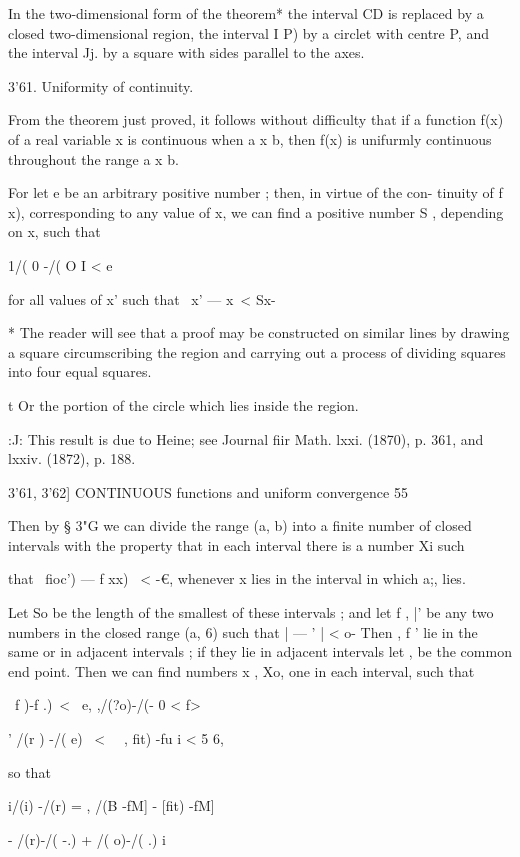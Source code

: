 In the two-dimensional form of the theorem* the interval CD is
replaced by a closed two-dimensional region, the interval I P) by a
circlet with centre P, and the interval Jj. by a square with sides
parallel to the axes.

3'61. Uniformity of continuity.

From the theorem just proved, it follows without difficulty that if a
function f(x) of a real variable x is continuous when a x b, then f(x)
is unifurmly continuous throughout the range a x b.

For let e be an arbitrary positive number ; then, in virtue of the
con- tinuity of f x), corresponding to any value of x, we can find a
positive number S , depending on x, such that

1/( 0 -/( O I < e

for all values of x' such that \ x' — x\ < Sx-

* The reader will see that a proof may be constructed on similar lines
by drawing a square circumscribing the region and carrying out a
process of dividing squares into four equal squares.

t Or the portion of the circle which lies inside the region.

:J: This result is due to Heine; see Journal fiir Math. lxxi. (1870),
p. 361, and lxxiv. (1872), p. 188.



3'61, 3'62] CONTINUOUS functions and uniform convergence 55

Then by § 3"G we can divide the range (a, b) into a finite number of
closed intervals with the property that in each interval there is a
number Xi such

that \ fioc') — f xx) \ < -€, whenever x lies in the interval in which
a;, lies.

Let So be the length of the smallest of these intervals ; and let f ,
|' be any two numbers in the closed range (a, 6) such that | — ' | <
o- Then , f ' lie in the same or in adjacent intervals ; if they lie
in adjacent intervals let , be the common end point. Then we can find
numbers x , Xo, one in each interval, such that

\ f )-f .)\ < \ e, ,/(?o)-/(- 0 < f>

' /(r ) -/( e) \ < \ \ , fit) -fu i < 5 6,

so that

i/(i) -/(r) = , /(B -fM] - [fit) -fM]

- /(r)-/( -.) + /( o)-/( .) i

